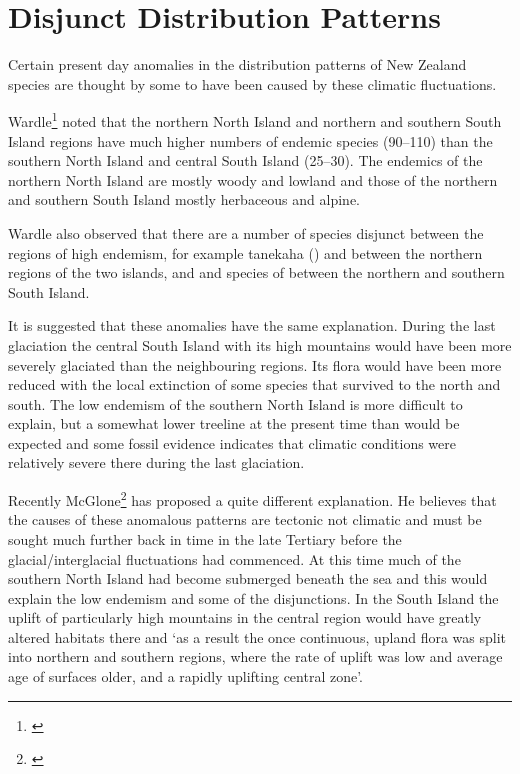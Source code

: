 \section{Disjunct Distribution Patterns}

Certain present day anomalies in the distribution patterns of New Zealand species are thought by some to have been caused by these climatic fluctuations.

Wardle\footnote{\cite{wardle1963evolution}} noted that the northern North Island and northern and southern South Island regions have much higher numbers of endemic species (90--110) than the southern North Island and central South Island (25--30).
The endemics of the northern North Island are mostly woody and lowland and those of the northern and southern South Island mostly herbaceous and alpine.

Wardle also observed that there are a number of species disjunct between the regions of high endemism, for example tanekaha () and  between the northern regions of the two islands, and  and species of  between the northern and southern South Island.

It is suggested that these anomalies have the same explanation.
During the last glaciation the central South Island with its high mountains would have been more severely glaciated than the neighbouring regions.
Its flora would have been more reduced with the local extinction of some species that survived to the north and south.
The low endemism of the southern North Island is more difficult to explain, but a somewhat lower treeline at the present time than would be expected and some fossil evidence indicates that climatic conditions were relatively severe there during the last glaciation.

Recently McGlone\footnote{\cite{mcglone1985plant}} has proposed a quite different explanation.
He believes that the causes of these anomalous patterns are tectonic not climatic and must be sought much further back in time in the late Tertiary before the glacial/interglacial fluctuations had commenced.
At this time much of the southern North Island had become submerged beneath the sea and this would explain the low endemism and some of the disjunctions.
In the South Island the uplift of particularly high mountains in the central region would have greatly altered habitats there and `as a result the once continuous, upland flora was split into northern and southern regions, where the rate of uplift was low and average age of surfaces older, and a rapidly uplifting central zone'.

